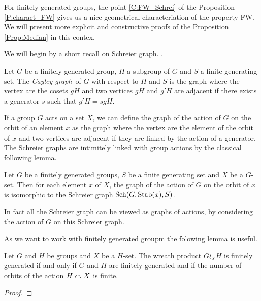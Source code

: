For finitely generated groups, the point \ref{C:FW_Schrei} of the Proposition \ref{P:charact_FW} gives us a nice geometrical characteriation of the property FW. We will present more explicit and constructive proofs of the Proposition \ref{Prop:Median} in this contex. 

We will begin by a short recall on Schreier graph. .
%
\begin{defn}
Let $G$ be a finitely generated group, $H$ a subgroup of $G$ and $S$ a finite generating set. The \emph{Cayley graph} of $G$ with respect to $H$ and $S$ is the graph where the vertex are the cosets $gH$ and two vertices $gH$ and $g'H$ are adjacent if there exists a generator $s$ such that $g'H = sgH$.
\end{defn}
%
If a group $G$ acts on a set $X$, we can define the graph of the action of $G$ on the orbit of an element $x$ as the graph where the vertex are the element of the orbit of $x$ and two vertices are adjacent if they are linked by the action of a generator. The Schreier graphs are intimitely linked with group actions by the classical following lemma.
%
\begin{lem}
Let $G$ be a finitely generated groups, $S$ be a finite generating set and $X$ be a $G$-set. Then for each element $x$ of $X$, the graph of the action of $G$ on the orbit of $x$ is isomorphic to the Schreier graph $\operatorname{Sch}(G,\operatorname{Stab}(x),S)$.
\end{lem}
%
In fact all the Schreier graph can be viewed as graphs of actions, by considering the action of $G$ on this Schreier graph.

As we want to work with finitely generated groupm the folowing lemma is useful.
\begin{lem}\label{L:wreath_fg}
Let $G$ and $H$ be groups and $X$ be a $H$-set. The wreath product $G \wr_X H$ is finitely generated if and only if $G$ and $H$ are finitely generated and if the number of orbits of the action $H \curvearrowright X$ is finite.
\end{lem}
\begin{proof}
\end{proof}

